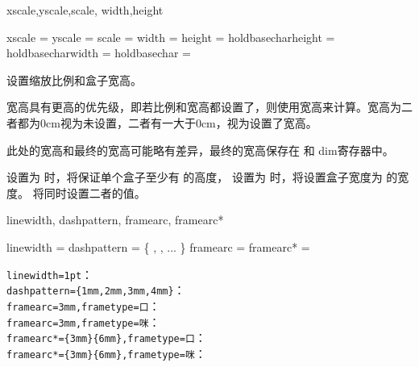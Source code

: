 \documentclass{ctxdoc}
\begin{document}
\begin{function}{
  xscale,yscale,scale,
  width,height
}
  \begin{syntax}
    xscale =  
    yscale =  
    scale  = 
    width  = 
    height = 
    holdbasecharheight = \TTF {}
    holdbasecharwidth  = \TTF {}
    holdbasechar       = \TTF
  \end{syntax}
  设置缩放比例和盒子宽高。

  宽高具有更高的优先级，即若比例和宽高都设置了，则使用宽高来计算。宽高为二者都为0cm视为未设置，二者有一大于0cm，视为设置了宽高。

  此处的宽高和最终的宽高可能略有差异，最终的宽高保存在  和  dim寄存器中。
  
  设置为  时，将保证单个盒子至少有  的高度， 设置为  时，将设置盒子宽度为  的宽度。 将同时设置二者的值。
\end{function}

\begin{function}{
  linewidth,
  dashpattern,
  framearc,
  framearc*
}
  \begin{syntax}
    linewidth   =  \init{0.4pt}
    dashpattern = \{ , , ... \}
    framearc    = 
    framearc*   =  
  \end{syntax}
\end{function}

{
\verb|linewidth=1pt|： \\
\verb|dashpattern={1mm,2mm,3mm,4mm}|： \\
\verb|framearc=3mm,frametype=|\verb|口|： \\
\verb|framearc=3mm,frametype=|\verb|咪|： \\
\verb|framearc*={3mm}{6mm},frametype=|\verb|口|： \\
\verb|framearc*={3mm}{6mm},frametype=|\verb|咪|：
}
\end{document}
